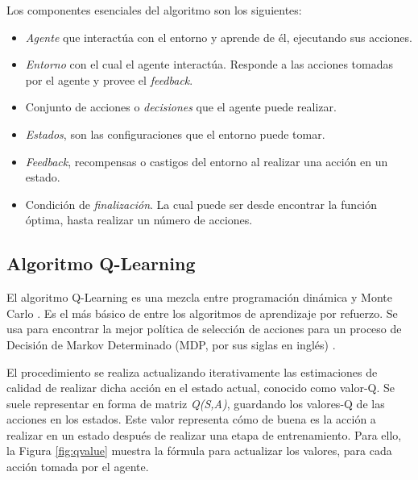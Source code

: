 	\begin{flushleft}
		Los componentes esenciales del algoritmo son los siguientes:
	\end{flushleft}
	\begin{itemize}
		\item \textit{Agente} que interactúa con el entorno y aprende de él, ejecutando sus acciones. 
		\item \textit{Entorno} con el cual el agente interactúa. Responde a las acciones tomadas por el agente y provee el \textit{feedback}.
		\item Conjunto de acciones o \textit{decisiones} que el agente puede realizar.
		\item \textit{Estados}, son las configuraciones que el entorno puede tomar.
		\item \textit{Feedback}, recompensas o castigos del entorno al realizar una acción en un estado.		
		\item Condición de \textit{finalización}. La cual puede ser desde encontrar la función óptima, hasta realizar un número de acciones.
	\end{itemize}


	\subsection{Algoritmo Q-Learning} 
		El algoritmo Q-Learning es una mezcla entre programación dinámica y Monte Carlo \cite{wang2012monte}. Es el más básico de entre los algoritmos de aprendizaje por refuerzo. Se usa para encontrar la mejor política de selección de acciones para un proceso de Decisión de Markov Determinado (MDP, por sus siglas en inglés) \cite{garcia2013markov}. 
		
		El procedimiento se realiza actualizando iterativamente las estimaciones de calidad de realizar dicha acción en el estado actual, conocido como valor-Q. Se suele representar en forma de matriz \textit{Q(S,A)}, guardando los valores-Q de las acciones en los estados. Este valor representa cómo de buena es la acción a realizar en un estado después de realizar una etapa de entrenamiento. Para ello, la Figura \ref{fig:qvalue} muestra la fórmula para actualizar los valores, para cada acción tomada por el agente.
				
